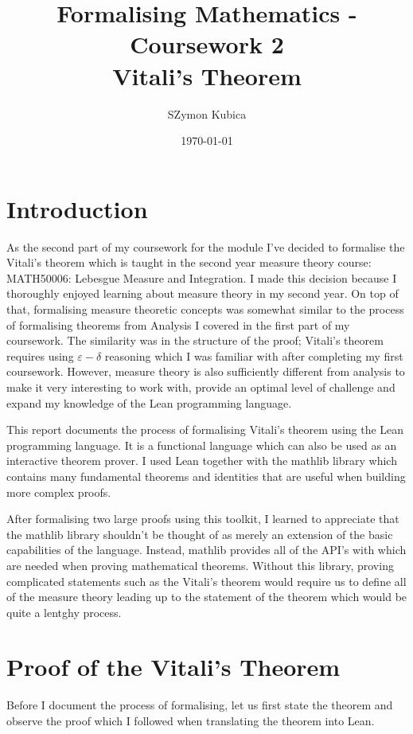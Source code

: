 \documentclass[11pt]{article}
\begin{document}
\title{Formalising Mathematics - Coursework 2 \\ Vitali's Theorem}
\date{\today}
\author{SZymon Kubica}
\maketitle

\section*{Introduction}

As the second part of my coursework for the module I've decided to formalise the Vitali's theorem
which is taught in the second year measure theory course: MATH50006:
Lebesgue Measure and Integration. I made this decision because I thoroughly enjoyed
learning about measure theory in my second year. On top of that, formalising measure
theoretic concepts was somewhat similar to the process of formalising theorems
from Analysis I covered in the first part of my coursework.
The similarity was in the structure of the proof; Vitali's theorem requires using
$\varepsilon-\delta$ reasoning which I was familiar with after completing my first
coursework. However, measure theory is also sufficiently different from analysis
to make it very interesting to work with, provide an optimal level of challenge
and expand my knowledge of the Lean programming language.

This report documents the process of formalising Vitali's theorem using the Lean
programming language. It is a functional language which can also be used as an interactive
theorem prover. I used Lean together with the mathlib library which contains many
fundamental theorems and identities that are useful when building more complex proofs.

After formalising two large proofs using this toolkit, I learned to appreciate that
the mathlib library shouldn't be thought of as merely an extension of the basic
capabilities of the language. Instead, mathlib provides all of the API's with which
are needed when proving mathematical theorems. Without this library,
proving complicated statements such as the Vitali's theorem would require us to
define all of the measure theory leading up to the statement of the theorem
which would be quite a lentghy process.

\section*{Proof of the Vitali's Theorem}
Before I document the process of formalising, let us first state the
theorem and observe the proof which I followed when translating the theorem
into Lean.
\end{document}
